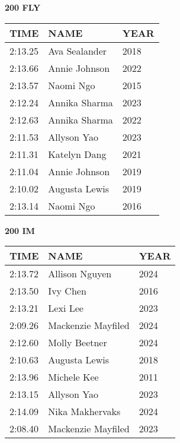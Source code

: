 \begin{minipage}[t]{0.48\textwidth}
\centering
\textbf{200 FLY}\\[0.05cm]
\begin{tabular}{@{}p{1.8cm}p{2.8cm}p{1.2cm}@{}}
\hline
\textbf{TIME} & \textbf{NAME} & \textbf{YEAR} \\
\hline
2:13.25 & Ava Sealander & 2018 \\
2:13.66 & Annie Johnson & 2022 \\
2:13.57 & Naomi Ngo & 2015 \\
2:12.24 & Annika Sharma & 2023 \\
2:12.63 & Annika Sharma & 2022 \\
2:11.53 & Allyson Yao & 2023 \\
2:11.31 & Katelyn Dang & 2021 \\
2:11.04 & Annie Johnson & 2019 \\
2:10.02 & Augusta Lewis & 2019 \\
2:13.14 & Naomi Ngo & 2016 \\
\hline
\end{tabular}
\end{minipage}\hfill
\begin{minipage}[t]{0.48\textwidth}
\centering
\textbf{200 IM}\\[0.05cm]
\begin{tabular}{@{}p{1.8cm}p{2.8cm}p{1.2cm}@{}}
\hline
\textbf{TIME} & \textbf{NAME} & \textbf{YEAR} \\
\hline
2:13.72 & Allison Nguyen & 2024 \\
2:13.50 & Ivy Chen & 2016 \\
2:13.21 & Lexi Lee & 2023 \\
2:09.26 & Mackenzie Mayfiled & 2024 \\
2:12.60 & Molly Beetner & 2024 \\
2:10.63 & Augusta Lewis & 2018 \\
2:13.96 & Michele Kee & 2011 \\
2:13.15 & Allyson Yao & 2023 \\
2:14.09 & Nika Makhervaks & 2024 \\
2:08.40 & Mackenzie Mayfiled & 2023 \\
\hline
\end{tabular}
\end{minipage}

\vspace{0.4cm}

